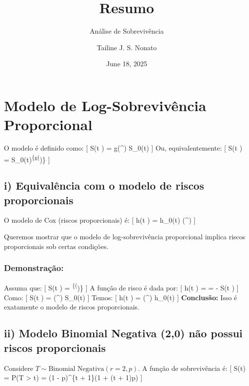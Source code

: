 \documentclass[
  letterpaper,
  DIV=11,
  numbers=noendperiod]{scrartcl}
\title{Resumo}
\subtitle{Análise de Sobrevivência}
\author{Tailine J. S. Nonato}
\date{June 18, 2025}
\begin{document}
\maketitle


\maketitle

\section*{Modelo de Log-Sobrevivência Proporcional}

O modelo é definido como: {[} \log S(t \mid {}) =
g(\^{}\top \beta) \cdot \log S\_0(t) {]} Ou, equivalentemente:
{[} S(t \mid {}) =
S\_0(t)\textsuperscript{\{g(}\top \beta)\} {]}

\subsection*{i) Equivalência com o modelo de riscos proporcionais}

O modelo de Cox (riscos proporcionais) é: {[} h(t \mid {}) =
h\_0(t) \cdot \exp(\^{}\top \beta) {]}

Queremos mostrar que o modelo de log-sobrevivência proporcional implica
riscos proporcionais sob certas condições.

\subsubsection*{Demonstração:}

Assuma que: {[} S(t \mid {}) =
\left[ S_0(t) \right]\textsuperscript{\{\exp(}\top \beta)\}
{]} A função de risco é dada por: {[} h(t \mid {}) =
 = -
\log S(t \mid {}) {]} Como: {[} \log S(t \mid {}) =
\exp(\^{}\top \beta) \cdot \log S\_0(t) {]} Temos: {[} h(t
\mid {}) = \exp(\^{}\top \beta) \cdot h\_0(t) {]}
\textbf{Conclusão:} Isso é exatamente o modelo de riscos proporcionais.

\subsection*{ii) Modelo Binomial Negativa (2,0) não possui riscos proporcionais}

Considere \(T \sim \text{Binomial Negativa}(r = 2, p)\). A função de
sobrevivência é: {[} S(t) = P(T \textgreater{} t) = (1 - p)\^{}\{t +
1\}(1 + (t + 1)p) {]}
\end{document}
